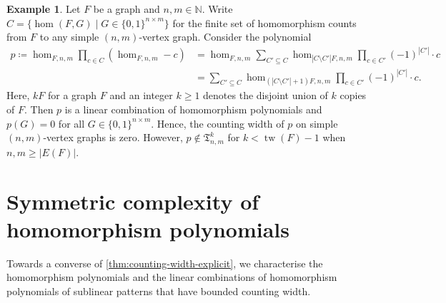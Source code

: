 \documentclass[11pt, DIV=15]{scrarticle}
\theoremstyle{definition}
\newtheorem{example}[definition]{Example}
\theoremstyle{plain}
\theoremstyle{remark}
\DeclareMathOperator{\tw}{tw}
\begin{document}
	\begin{example}\label{ex:simple-interpolation}
		Let $F$ be a graph and $n,m\in \mathbb{N}$.
		Write $C = \{\hom(F, G) \mid G \in \{0,1\}^{n \times m}\}$ for the finite set of homomorphism counts from $F$ to any simple $(n,m)$-vertex graph.
		Consider the polynomial
		\begin{align*}
		p \coloneqq \hom_{F, n,m} \prod_{c \in C} (\hom_{F, n,m} - c)
		&= \hom_{F, n,m} \sum_{C' \subseteq C} \hom_{|C \setminus C'| F, n,m} \prod_{c \in C'} (-1)^{|C'|} \cdot c\\
		&=   \sum_{C' \subseteq C} \hom_{(|C \setminus C'|+1) F, n,m} \prod_{c \in C'} (-1)^{|C'|} \cdot c.
		\end{align*}
		Here, $kF$ for a graph $F$ and an integer $k \geq 1$ denotes the disjoint union of $k$ copies of $F$.
		Then $p$ is a linear combination of homomorphism polynomials and $p(G) = 0$ for all $G \in \{0,1\}^{n \times m}$.
		Hence, the counting width of $p$ on simple $(n,m)$-vertex graphs is zero.
		However, $p \not\in \mathfrak{T}^{k}_{n,m}$ for $k < \tw(F) - 1$ when $n,m \geq |E(F)|$.
	\end{example}
	
	

	
	\section{Symmetric complexity of homomorphism polynomials}
	
	Towards a converse of \cref{thm:counting-width-explicit},
	we characterise the homomorphism polynomials and the linear combinations of homomorphism polynomials of sublinear patterns that have bounded counting width.
	
\end{document}
